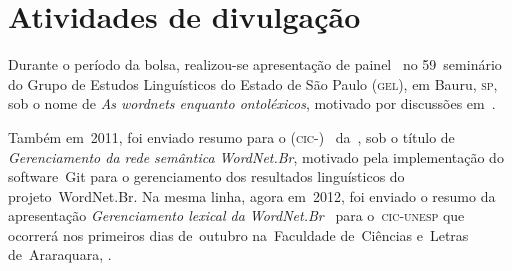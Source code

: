\chapter{Atividades de divulgação}

Durante o período da bolsa, realizou-se apresentação de
painel~\cite{araujoetal} no 59\textordmasculine~seminário do Grupo de Estudos
Linguísticos do Estado de São Paulo (\textsc{gel}), em Bauru, \textsc{sp}, sob o
nome de \textit{As wordnets enquanto ontoléxicos}, motivado por discussões
em~.

Também em~2011, foi enviado resumo para o
(\textsc{cic}-\unesp)~\cite{resumocic} da~\unesp, sob o título de
\textit{Gerenciamento da rede semântica WordNet.Br}, motivado pela
implementação do software~Git para o gerenciamento dos resultados linguísticos
do projeto~WordNet.Br. Na mesma linha, agora em~2012, foi enviado o resumo da
  apresentação \textit{Gerenciamento lexical da WordNet.Br}~\cite{resumocic2}
  para o~\textsc{cic-unesp} que ocorrerá nos primeiros dias de~outubro
  na~Faculdade de~Ciências e~Letras de~Araraquara, \unesp.
